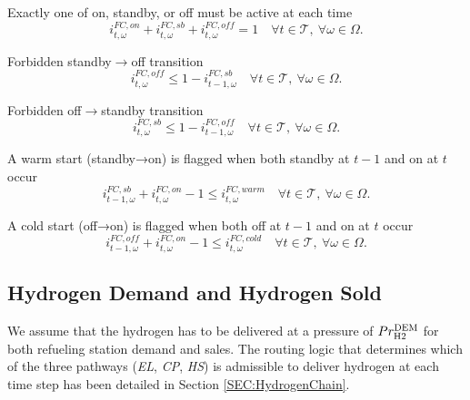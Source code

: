 \documentclass{article}
\begin{document}
Exactly one of on, standby, or off must be active at each time
\begin{equation} \label{EQ:FC_one_state}
    i^{FC,on}_{t,\omega} + i^{FC,sb}_{t,\omega} + i^{FC,off}_{t,\omega} = 1 \quad \forall t \in \mathcal{T}, \ \forall \omega \in \Omega.
\end{equation}

Forbidden standby$\rightarrow$off transition
\begin{equation} \label{EQ:FC_no_sb_off1}
    i^{FC,off}_{t,\omega} \leq 1 - i^{FC,sb}_{t-1,\omega} \quad \forall t \in \mathcal{T}, \ \forall \omega \in \Omega.
\end{equation}

Forbidden off$\rightarrow$standby transition
\begin{equation} \label{EQ:FC_no_sb_off2}
    i^{FC,sb}_{t,\omega} \leq 1 - i^{FC,off}_{t-1,\omega} \quad \forall t \in \mathcal{T}, \ \forall \omega \in \Omega.
\end{equation}

A warm start (standby→on) is flagged when both standby at $t-1$ and on at $t$ occur
\begin{equation} \label{EQ:FC_warm_lower}
    i^{FC,sb}_{t-1,\omega} + i^{FC,on}_{t,\omega} - 1 \leq i^{FC,warm}_{t,\omega} \quad \forall t \in \mathcal{T}, \ \forall \omega \in \Omega.
\end{equation}

A cold start (off→on) is flagged when both off at $t-1$ and on at $t$ occur
\begin{equation} \label{EQ:FC_cold_lower}
    i^{FC,off}_{t-1,\omega} + i^{FC,on}_{t,\omega} - 1 \leq i^{FC,cold}_{t,\omega} \quad \forall t \in \mathcal{T}, \ \forall \omega \in \Omega.
\end{equation}


\subsection{Hydrogen Demand and Hydrogen Sold}
\label{SEC:HydrogenDemand}

We assume that the hydrogen has to be delivered at a pressure of \(Pr^{\rm DEM}_{\rm H2}\) for both refueling station demand and sales. The routing logic that determines which of the three pathways (\textit{EL}, \textit{CP}, \textit{HS}) is admissible to deliver hydrogen at each time step has been detailed in Section \ref{SEC:HydrogenChain}.
\end{document}
